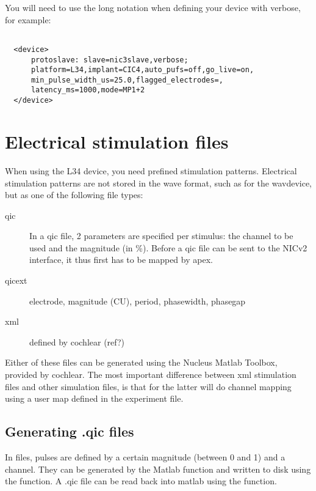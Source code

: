 You will need to use the long notation when defining your device with verbose, for example:

\begin{lstlisting}

  <device>
      protoslave: slave=nic3slave,verbose;
      platform=L34,implant=CIC4,auto_pufs=off,go_live=on,
      min_pulse_width_us=25.0,flagged_electrodes=,
      latency_ms=1000,mode=MP1+2
  </device>

\end{lstlisting}


\section{Electrical stimulation files}

When using the L34 device, you need prefined stimulation patterns.
Electrical stimulation patterns are not stored in the wave format, such as for the wavdevice, but as one of the following file types:


\begin{description}
\item[qic] In a qic file, 2 parameters are specified per stimulus:
the channel to be used and the magnitude (in \%). Before a qic
file can be sent to the NICv2 interface, it thus first has to be
mapped by apex.
\item[qicext] electrode, magnitude (CU), period, phasewidth, phasegap
\item[xml] defined by cochlear (ref?)
\end{description}

Either of these files can be generated using the Nucleus Matlab Toolbox, provided by cochlear. The most important difference between xml stimulation files and other simulation files, is that for the latter \apex will do channel mapping using a user map defined in the experiment file.

\subsection{Generating .qic files}
In  files, pulses are defined by a certain magnitude (between 0
and 1) and a channel. They can be generated by the Matlab function
 and written to disk using the  function. A .qic file can be read back into matlab using the  function.

